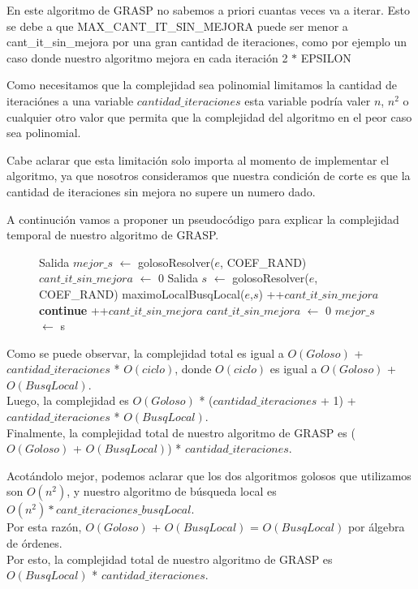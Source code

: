 En este algoritmo de GRASP no sabemos a priori cuantas veces va a iterar. Esto se debe a que MAX\_CANT\_IT\_SIN\_MEJORA puede ser menor a cant\_it\_sin\_mejora por una gran cantidad de iteraciones, como por ejemplo un caso donde nuestro algoritmo mejora en cada iteración 2 $*$ EPSILON

Como necesitamos que la complejidad sea polinomial limitamos la cantidad de iteraciónes a una variable $cantidad\_iteraciones$ esta variable podría valer $n$, $n^2$ o cualquier otro valor que permita que la complejidad del algoritmo en el peor caso sea polinomial.

Cabe aclarar que esta limitación solo importa al momento de implementar el algoritmo, ya que nosotros consideramos que nuestra condición de corte es que la cantidad de iteraciones sin mejora no supere un numero dado.

A continución vamos a proponer un pseudocódigo para explicar la complejidad temporal de nuestro algoritmo de GRASP.

\begin{center}
 \begin{figure}[H]
  \begin{pseudo}
    \State Salida $mejor\_s$ $\leftarrow$ golosoResolver($e$, COEF\_RAND) 
    \State $cant\_it\_sin\_mejora$ $\leftarrow$ 0 
     
      \State Salida $s$ $\leftarrow$ golosoResolver($e$, COEF\_RAND) 
      \State maximoLocalBusqLocal($e$,$s$) 
       
	\State++$cant\_it\_sin\_mejora$ 
	\State \textbf{continue}
      \EndIf
       
	\State ++$cant\_it\_sin\_mejora$ 
      \Else
	\State $cant\_it\_sin\_mejora$ $\leftarrow$ 0 
      \EndIf
       
	\State $mejor\_s$ $\leftarrow$ s 
      \EndIf
    \EndWhile
    \EndProcedure
  \end{pseudo}
 \end{figure}
\end{center}

Como se puede observar, la complejidad total es igual a $O(Goloso)$ + $cantidad\_iteraciones$ * $O(ciclo)$, donde $O(ciclo)$ es igual a  $O(Goloso)$ + $O(BusqLocal)$.\\
Luego, la complejidad es $O(Goloso)$ * ($cantidad\_iteraciones$ + 1) + $cantidad\_iteraciones$ * $O(BusqLocal)$.\\
Finalmente, la complejidad total de nuestro algoritmo de GRASP es ($O(Goloso)$ + $O(BusqLocal)$) * $cantidad\_iteraciones$.

Acotándolo mejor, podemos aclarar que los dos algoritmos golosos que utilizamos son $O(n^2)$, y nuestro algoritmo de búsqueda local es $O(n^2) * cant\_iteraciones\_busqLocal$.\\
Por esta razón, $O(Goloso)$ + $O(BusqLocal)$ = $O(BusqLocal)$ por álgebra de órdenes.\\
Por esto, la complejidad total de nuestro algoritmo de GRASP es $O(BusqLocal)$ * $cantidad\_iteraciones$.